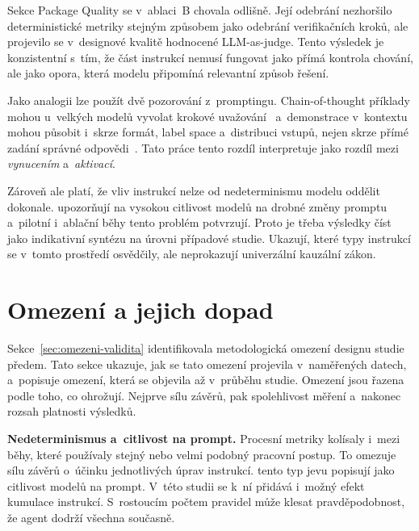 Sekce Package Quality se v~ablaci~B chovala odlišně. Její odebrání
nezhoršilo deterministické metriky stejným způsobem jako odebrání
verifikačních kroků, ale projevilo se v~designové kvalitě hodnocené
LLM-as-judge. Tento výsledek je konzistentní s~tím, že část instrukcí
nemusí fungovat jako přímá kontrola chování, ale jako opora, která
modelu připomíná relevantní způsob řešení.

Jako analogii lze použít dvě pozorování z~promptingu.
Chain-of-thought příklady mohou u~velkých modelů vyvolat krokové
uvažování~\cite{wei2022cot} a~demonstrace v~kontextu mohou působit
i~skrze formát, label space a~distribuci vstupů, nejen skrze přímé
zadání správné odpovědi~\cite{min2022rethinking}. Tato práce tento
rozdíl interpretuje jako rozdíl mezi \textit{vynucením}
a~\textit{aktivací}.

Zároveň ale platí, že vliv instrukcí nelze od nedeterminismu modelu
oddělit dokonale. \textcite{razavi2025} upozorňují na vysokou
citlivost modelů na drobné změny promptu a~pilotní i~ablační běhy
tento problém potvrzují. Proto je třeba výsledky číst jako
indikativní syntézu na úrovni případové studie. Ukazují, které typy
instrukcí se v~tomto prostředí osvědčily, ale neprokazují univerzální
kauzální zákon.

\section{Omezení a jejich dopad}
\label{sec:limity-vysledky}

Sekce~\ref{sec:omezeni-validita} identifikovala metodologická
omezení designu studie předem. Tato sekce ukazuje, jak se tato omezení
projevila v~naměřených datech, a~popisuje omezení, která se
objevila až v~průběhu studie. Omezení jsou řazena podle toho, co
ohrožují. Nejprve sílu závěrů, pak spolehlivost měření a~nakonec
rozsah platnosti výsledků.


\textbf{Nedeterminismus a~citlivost na prompt.}
Procesní metriky kolísaly i~mezi běhy, které používaly stejný nebo
velmi podobný pracovní postup. To omezuje sílu závěrů o~účinku
jednotlivých úprav instrukcí. \textcite{razavi2025} tento typ jevu
popisují jako citlivost modelů na prompt. V~této studii se k~ní
přidává i~možný efekt kumulace instrukcí. S~rostoucím počtem pravidel
může klesat pravděpodobnost, že agent dodrží všechna současně.

